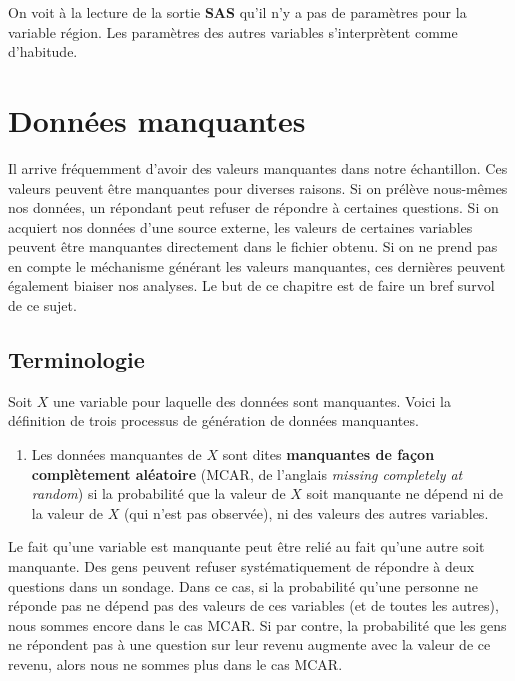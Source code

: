 \documentclass[
  11pt,
  letterpaper,
]{book}
\providecommand{\tightlist}{%
  \setlength{\itemsep}{0pt}\setlength{\parskip}{0pt}}
\theoremstyle{definition}
\theoremstyle{definition}
\theoremstyle{definition}
\theoremstyle{remark}
\begin{document}
On voit à la lecture de la sortie \textbf{SAS} qu'il n'y a pas de paramètres pour la variable région. Les paramètres des autres variables s'interprètent comme d'habitude.

\hypertarget{donnuxe9es-manquantes-1}{%
\chapter{Données manquantes}\label{donnuxe9es-manquantes-1}}

Il arrive fréquemment d'avoir des valeurs manquantes dans notre échantillon. Ces valeurs peuvent être manquantes pour diverses raisons. Si on prélève nous-mêmes nos données, un répondant peut refuser de répondre à certaines questions. Si on acquiert nos données d'une source externe, les valeurs de certaines variables peuvent être manquantes directement dans le fichier obtenu. Si on ne prend pas en compte le méchanisme générant les valeurs manquantes, ces dernières peuvent également biaiser nos analyses. Le but de ce chapitre est de faire un bref survol de ce sujet.

\hypertarget{terminologie}{%
\section{Terminologie}\label{terminologie}}

Soit \(X\) une variable pour laquelle des données sont manquantes. Voici la définition de trois processus de génération de données manquantes.

\begin{enumerate}
\def\labelenumi{\arabic{enumi})}
\tightlist
\item
  Les données manquantes de \(X\) sont dites \textbf{manquantes de façon complètement aléatoire} (MCAR, de l'anglais \emph{missing completely at random}) si la probabilité que la valeur de \(X\) soit manquante ne dépend ni de la valeur de \(X\) (qui n'est pas observée), ni des valeurs des autres variables.
\end{enumerate}

Le fait qu'une variable est manquante peut être relié au fait qu'une autre soit manquante. Des gens peuvent refuser systématiquement de répondre à deux questions dans un sondage. Dans ce cas, si la probabilité qu'une personne ne réponde pas ne dépend pas des valeurs de ces variables (et de toutes les autres), nous sommes encore dans le cas MCAR. Si par contre, la probabilité que les gens ne répondent pas à une question sur leur revenu augmente avec la valeur de ce revenu, alors nous ne sommes plus dans le cas MCAR.
\end{document}

